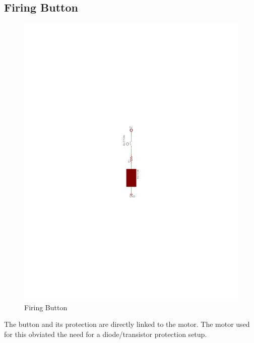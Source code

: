 \documentclass[a4paper, 11pt]{article}
\begin{document}
	\subsection{Firing Button}
	\begin{figure}[!ht]
		\centering
		\vspace{-10cm}
		\includegraphics{report-images/firing-button}
		\vspace{-10.5cm}
		\caption{Firing Button}
	\end{figure}
	\noindent The button and its protection are directly linked to the motor.  The motor used for this obviated the need for a diode/transistor protection setup.
\newpage
\end{document}
